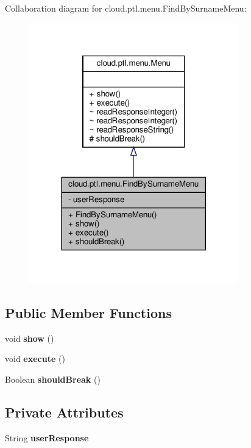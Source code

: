 Collaboration diagram for cloud.\+ptl.\+menu.\+Find\+By\+Surname\+Menu\+:
\nopagebreak
\begin{figure}[H]
\begin{center}
\leavevmode
\includegraphics[width=257pt]{classcloud_1_1ptl_1_1menu_1_1FindBySurnameMenu__coll__graph}
\end{center}
\end{figure}
\subsection*{Public Member Functions}
\begin{DoxyCompactItemize}
\item 
\mbox{\label{classcloud_1_1ptl_1_1menu_1_1FindBySurnameMenu_a3ceaf3ae4f0ab91483e0de9687928f80}} 
void {\bfseries show} ()
\item 
\mbox{\label{classcloud_1_1ptl_1_1menu_1_1FindBySurnameMenu_a10f90fb3dab435801b6d7f0e66536d01}} 
void {\bfseries execute} ()
\item 
\mbox{\label{classcloud_1_1ptl_1_1menu_1_1FindBySurnameMenu_a72d322ef1d72a120c2baa21a50adb03b}} 
Boolean {\bfseries should\+Break} ()
\end{DoxyCompactItemize}
\subsection*{Private Attributes}
\begin{DoxyCompactItemize}
\item 
\mbox{\label{classcloud_1_1ptl_1_1menu_1_1FindBySurnameMenu_aaa1d62ad4db1b0a1c1a256166ca0d590}} 
String {\bfseries user\+Response}
\end{DoxyCompactItemize}
